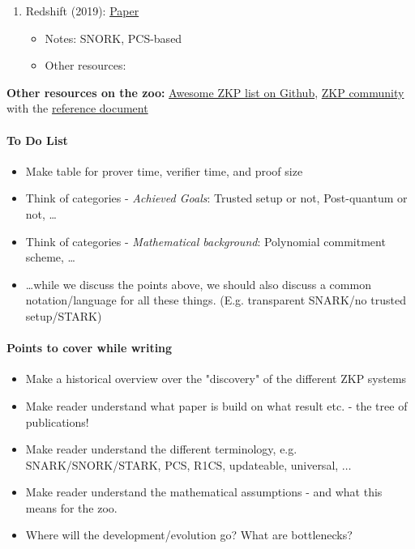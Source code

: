 {\begin{enumerate}
	\item Redshift (2019): \href{https://eprint.iacr.org/2019/1400}{Paper}
	\begin{itemize}[label={--}]
		\item Notes: SNORK, PCS-based
		\item Other resources: 
	\end{itemize}



\end{enumerate}

\textbf{Other resources on the zoo: } \href{https://github.com/matter-labs/awesome-zero-knowledge-proofs}{Awesome ZKP list on Github}, \href{https://zkp.science/}{ZKP community} with the \href{https://docs.zkproof.org/reference.pdf}{reference document}

}

\paragraph{To Do List}
\begin{itemize}
	\item Make table for prover time, verifier time, and proof size
	\item Think of categories - \textit{Achieved Goals}: Trusted setup or not, Post-quantum or not, \dots
	\item Think of categories - \textit{Mathematical background}: Polynomial commitment scheme, \dots
	\item \dots while we discuss the points above, we should also discuss a common notation/language for all these things. (E.g. transparent SNARK/no trusted setup/STARK)
\end{itemize}

\paragraph{Points to cover while writing}
\begin{itemize}
	\item Make a historical overview over the "discovery" of the different ZKP systems
	\item Make reader understand what paper is build on what result etc. - the tree of publications!
	\item Make reader understand the different terminology, e.g. SNARK/SNORK/STARK, PCS, R1CS, updateable, universal, $\dots$
	\item Make reader understand the mathematical assumptions - and what this means for the zoo.
	\item Where will the development/evolution go? What are bottlenecks?
\end{itemize}

